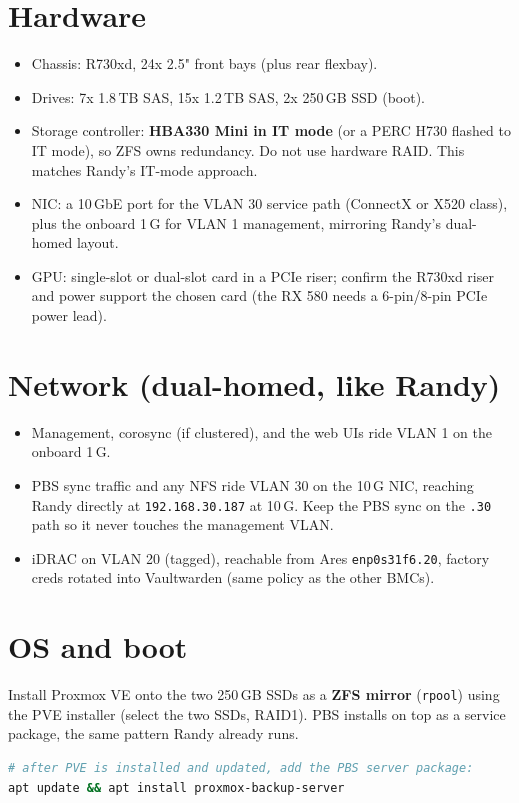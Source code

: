 \documentclass[11pt]{article}
\begin{document}
\section{Hardware}
\begin{itemize}
  \item Chassis: R730xd, 24x 2.5" front bays (plus rear flexbay).
  \item Drives: 7x 1.8\,TB SAS, 15x 1.2\,TB SAS, 2x 250\,GB SSD (boot).
  \item Storage controller: \textbf{HBA330 Mini in IT mode} (or a PERC H730 flashed to IT mode),
  so ZFS owns redundancy. Do not use hardware RAID. This matches Randy's IT-mode approach.
  \item NIC: a 10\,GbE port for the VLAN 30 service path (ConnectX or X520 class), plus the
  onboard 1\,G for VLAN 1 management, mirroring Randy's dual-homed layout.
  \item GPU: single-slot or dual-slot card in a PCIe riser; confirm the R730xd riser and power
  support the chosen card (the RX 580 needs a 6-pin/8-pin PCIe power lead).
\end{itemize}

\section{Network (dual-homed, like Randy)}
\begin{itemize}
  \item Management, corosync (if clustered), and the web UIs ride VLAN 1 on the onboard 1\,G.
  \item PBS sync traffic and any NFS ride VLAN 30 on the 10\,G NIC, reaching Randy directly at
  \texttt{192.168.30.187} at 10\,G. Keep the PBS sync on the \texttt{.30} path so it never
  touches the management VLAN.
  \item iDRAC on VLAN 20 (tagged), reachable from Ares \texttt{enp0s31f6.20}, factory creds
  rotated into Vaultwarden (same policy as the other BMCs).
\end{itemize}

\section{OS and boot}
Install Proxmox VE onto the two 250\,GB SSDs as a \textbf{ZFS mirror} (\texttt{rpool}) using the
PVE installer (select the two SSDs, RAID1). PBS installs on top as a service package, the same
pattern Randy already runs.
\begin{lstlisting}[language=bash]
# after PVE is installed and updated, add the PBS server package:
apt update && apt install proxmox-backup-server
\end{lstlisting}
\end{document}

